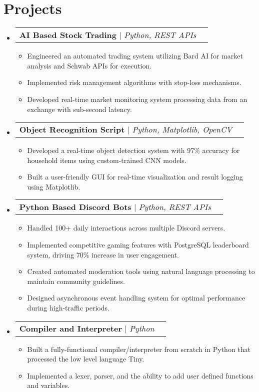 \documentclass[letterpaper,11pt]{article}
\makeatletter
\newcommand{\resumeItem}[1]{
  \item\small{
    {#1 \vspace{-2pt}}
  }
}
\newcommand{\resumeProjectHeading}[2]{
    \item
    \begin{tabular*}{0.97\textwidth}{l@{\extracolsep{\fill}}r}
      \small#1 & #2 \\
    \end{tabular*}\vspace{-7pt}
}
\newcommand{\resumeSubHeadingListStart}{\begin{itemize}[leftmargin=0.15in, label={}]}
\newcommand{\resumeSubHeadingListEnd}{\end{itemize}}
\newcommand{\resumeItemListStart}{\begin{itemize}}
\newcommand{\resumeItemListEnd}{\end{itemize}\vspace{-5pt}}
\makeatother
\begin{document}
\section{Projects}
\resumeSubHeadingListStart
\resumeProjectHeading
    {\textbf{AI Based Stock Trading} $|$ \emph{Python, REST APIs}}{}
      \resumeItemListStart
        \resumeItem{Engineered an automated trading system utilizing Bard AI for market analysis and Schwab APIs for execution.}
        \resumeItem{Implemented risk management algorithms with stop-loss mechanisms.}
        \resumeItem{Developed real-time market monitoring system processing data from an exchange with sub-second latency.}
      \resumeItemListEnd
\resumeProjectHeading
    {\textbf{Object Recognition Script} $|$ \emph{Python, Matplotlib, OpenCV}}{}
      \resumeItemListStart
        \resumeItem{Developed a real-time object detection system with 97\% accuracy for household items using custom-trained CNN models.}
        \resumeItem{Built a user-friendly GUI for real-time visualization and result logging using Matplotlib.}
      \resumeItemListEnd
\resumeProjectHeading
    {\textbf{Python Based Discord Bots} $|$ \emph{Python, REST APIs}}{}
      \resumeItemListStart
        \resumeItem{Handled 100+ daily interactions across multiple Discord servers.}
        \resumeItem{Implemented competitive gaming features with PostgreSQL leaderboard system, driving 70\% increase in user engagement.}
        \resumeItem{Created automated moderation tools using natural language processing to maintain community guidelines.}
        \resumeItem{Designed asynchronous event handling system for optimal performance during high-traffic periods.}
      \resumeItemListEnd
\resumeProjectHeading
    {\textbf{Compiler and Interpreter} $|$ \emph{Python}}{}
      \resumeItemListStart
        \resumeItem{Built a fully-functional compiler/interpreter from scratch in Python that processed the low level language Tiny.}
        \resumeItem{Implemented a lexer, parser, and the ability to add user defined functions and variables.}
      \resumeItemListEnd

\resumeSubHeadingListEnd


\end{document}
